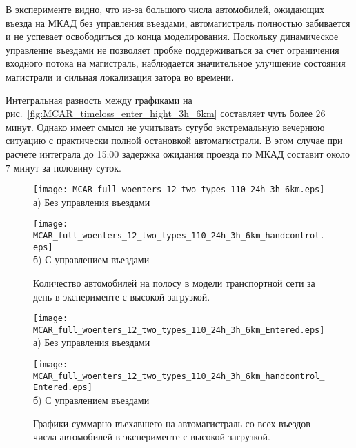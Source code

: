 В эксперименте видно, что из-за большого числа автомобилей, ожидающих въезда на МКАД без управления въездами, автомагистраль полностью забивается и не успевает освободиться до конца моделирования.
Поскольку динамическое управление въездами не позволяет пробке поддерживаться за счет ограничения входного потока на магистраль, наблюдается значительное улучшение состояния магистрали и сильная локализация затора во времени.

Интегральная разность между графиками на рис.~\ref{fig:MCAR_timeloss_enter_hight_3h_6km} составляет чуть более $26$ минут.
Однако имеет смысл не учитывать сугубо экстремальную вечернюю ситуацию с практически полной остановкой автомагистрали. В этом случае при расчете интеграла до 15:00 задержка ожидания проезда по МКАД составит около $7$ минут за половину суток.

\begin{figure}[ht]
    \begin{minipage}[b][][b]{0.49\textwidth}
        \centering
        \texttt{[image: MCAR\_full\_woenters\_12\_two\_types\_110\_24h\_3h\_6km.eps]} \\ а) Без управления въездами
    \end{minipage}
    \hfill
    \begin{minipage}[b][][b]{0.49\textwidth}
        \centering
        \texttt{[image: MCAR\_full\_woenters\_12\_two\_types\_110\_24h\_3h\_6km\_handcontrol.eps]} \\ б) С управлением въездами
    \end{minipage}

    \caption{Количество автомобилей на полосу в модели транспортной сети за день в эксперименте с высокой загрузкой.}
    \label{fig:MCAR_heatmap_hight_3h_6km}
\end{figure}

\begin{figure}[ht]
    \begin{minipage}[b][][b]{.49\textwidth}
        \centering
        \texttt{[image: MCAR\_full\_woenters\_12\_two\_types\_110\_24h\_3h\_6km\_Entered.eps]} \\ а) Без управления въездами
    \end{minipage}
    \hfill
    \begin{minipage}[b][][b]{.49\textwidth}
        \centering
        \texttt{[image: MCAR\_full\_woenters\_12\_two\_types\_110\_24h\_3h\_6km\_handcontrol\_Entered.eps]} \\ б) С управлением въездами
    \end{minipage}

    \caption{Графики суммарно въехавшего на автомагистраль со всех въездов числа автомобилей в эксперименте с высокой загрузкой.}
    \label{fig:MCAR_entered_hight_3h_6km}
\end{figure}


